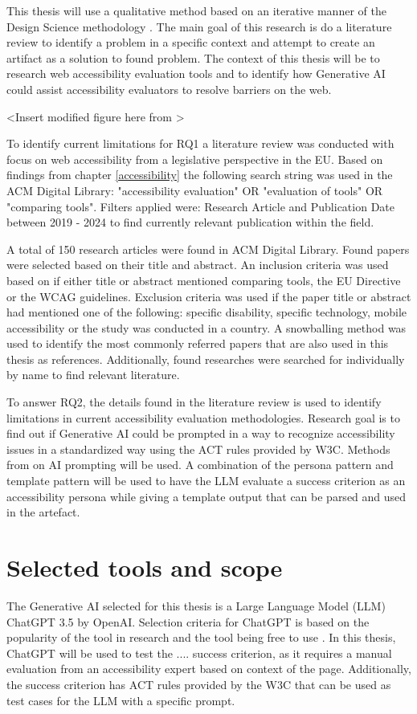 This thesis will use a qualitative method based on an iterative manner of the Design Science methodology \citep{designsciencemethodology, iterativedesignscience}. The main goal of this research is do a literature review to identify a problem in a specific context and attempt to create an artifact as a solution to found problem. The context of this thesis will be to research web accessibility evaluation tools and to identify how Generative AI could assist accessibility evaluators to resolve barriers on the web. 

<Insert modified figure here from \textcite{iterativedesignscience}>

To identify current limitations for RQ1 a literature review was conducted with focus on web accessibility from a legislative perspective in the EU. Based on findings from chapter \ref{accessibility} the following search string was used in the ACM Digital Library: "accessibility evaluation" OR "evaluation of tools" OR "comparing tools". Filters applied were: Research Article and Publication Date between 2019 - 2024 to find currently relevant publication within the field. 

A total of 150 research articles were found in ACM Digital Library. Found papers were selected based on their title and abstract. An inclusion criteria was used based on if either title or abstract mentioned comparing tools, the EU Directive or the WCAG guidelines. Exclusion criteria was used if the paper title or abstract had mentioned one of the following: specific disability, specific technology, mobile accessibility or the study was conducted in a country. A snowballing method was used to identify the most commonly referred papers that are also used in this thesis as references. Additionally, found researches were searched for individually by name to find relevant literature.

To answer RQ2, the details found in the literature review is used to identify limitations in current accessibility evaluation methodologies. Research goal is to find out if Generative AI could be prompted in a way to recognize accessibility issues in a standardized way using the ACT rules provided by W3C. Methods from \textcite{white2023prompt} on AI prompting will be used. A combination of the persona pattern and template pattern will be used to have the LLM evaluate a success criterion as an accessibility persona while giving a template output that can be parsed and used in the artefact.


\section{Selected tools and scope}

The Generative AI selected for this thesis is a Large Language Model (LLM) ChatGPT 3.5 by OpenAI. Selection criteria for ChatGPT is based on the popularity of the tool in research and the tool being free to use \citep{ouyang2023llm, white2023prompt}. In this thesis, ChatGPT will be used to test the .... success criterion, as it requires a manual evaluation from an accessibility expert based on context of the page. Additionally, the success criterion has ACT rules provided by the W3C that can be used as test cases for the LLM with a specific prompt.

